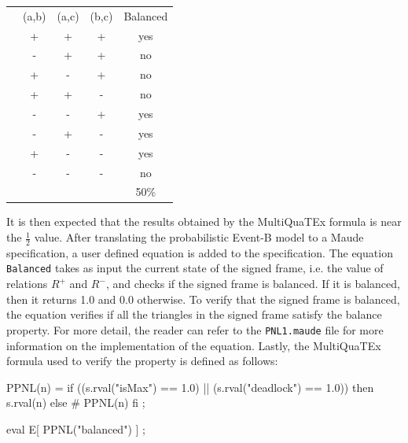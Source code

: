 \begin{table}[H]
\centering
        \begin{tabular}{lccc|c|}
        \cline{2-5}
        \multicolumn{1}{l|}{} & \multicolumn{1}{c|}{(a,b)} & \multicolumn{1}{c|}{(a,c)} & (b,c)                 & Balanced \\ \cline{2-5} 
        \multicolumn{1}{l|}{} & \multicolumn{1}{c|}{+}     & \multicolumn{1}{c|}{+}     & +                     & yes      \\ \cline{2-5} 
        \multicolumn{1}{l|}{} & \multicolumn{1}{c|}{-}     & \multicolumn{1}{c|}{+}     & +                     & no       \\ \cline{2-5} 
        \multicolumn{1}{l|}{} & \multicolumn{1}{c|}{+}     & \multicolumn{1}{c|}{-}     & +                     & no       \\ \cline{2-5} 
        \multicolumn{1}{l|}{} & \multicolumn{1}{c|}{+}     & \multicolumn{1}{c|}{+}     & -                     & no       \\ \cline{2-5} 
        \multicolumn{1}{l|}{} & \multicolumn{1}{c|}{-}     & \multicolumn{1}{c|}{-}     & +                     & yes      \\ \cline{2-5} 
        \multicolumn{1}{l|}{} & \multicolumn{1}{c|}{-}     & \multicolumn{1}{c|}{+}     & -                     & yes      \\ \cline{2-5} 
        \multicolumn{1}{l|}{} & \multicolumn{1}{c|}{+}     & \multicolumn{1}{c|}{-}     & -                     & yes      \\ \cline{2-5} 
        \multicolumn{1}{l|}{} & \multicolumn{1}{c|}{-}     & \multicolumn{1}{c|}{-}     & -                     & no       \\ \cline{2-5} 
                              & \multicolumn{1}{l}{}       & \multicolumn{1}{l}{}       & \multicolumn{1}{l|}{} & 50\%     \\ \cline{5-5} 
        \end{tabular}
        \end{table}
It is then expected that the results obtained by the MultiQuaTEx formula is near the $\frac{1}{2}$ value. After translating the probabilistic Event-B model to a Maude specification, a user defined equation is added to the specification. The equation \texttt{Balanced} takes as input
the current state of the signed frame, i.e. the value of relations $R^+$ and $R^-$, and checks if the signed frame is balanced. If it is balanced, then it returns 1.0 and 0.0 otherwise. To verify that the signed frame is balanced, the equation verifies if all the triangles in the signed frame satisfy the balance property. For more detail, the reader can refer to the \texttt{PNL1.maude} file for more information on the implementation of the equation. Lastly, the MultiQuaTEx formula used to verify the property is defined as follows:
\begin{maude2}

PPNL(n) = if ((s.rval("isMax") == 1.0) || (s.rval("deadlock") == 1.0)) 
	     then s.rval(n) else # PPNL(n) fi ;

eval E[ PPNL("balanced") ] ; 
\end{maude2}

